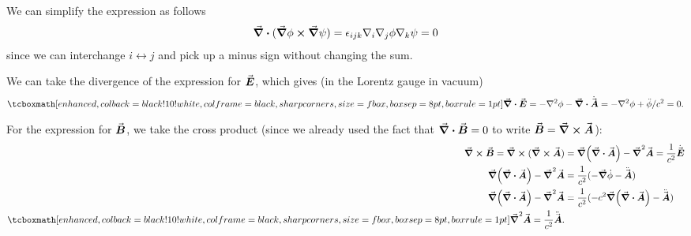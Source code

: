 
We can simplify the expression as follows
\begin{eqnarray}
    \label{eq:div-cross-grads}
    \grad \vdot (\grad\phi \cross \grad\psi) = \epsilon_{ijk} \nabla_{i} \nabla_{j} \phi \nabla_{k}\psi = 0
\end{eqnarray}
since we can interchange $i \leftrightarrow j$ and pick up a minus sign without changing the sum.


We can take the divergence of the expression for $\va*{E}$, which gives (in the Lorentz gauge in vacuum)
\begin{eqnarray}
    \label{eq:div-E}
    \eqbox{
    \grad \vdot \va*{E} = -\laplacian\phi - \grad \vdot \dot{\va*{A}} = -\laplacian\phi + \ddot{\phi}/c^2 = 0
}
.\end{eqnarray}

For the expression for $\va*{B}$, we take the cross product (since we already used the fact that $\grad \vdot \va*{B} = 0$ to write $\va*{B} = \grad \cross \va*{A}$):
\begin{align}
    \label{eq:curl-B}
    \grad \cross \va*{B} = \grad \cross (\grad \cross \va*{A}) &= \grad(\grad \vdot \va*{A}) - \grad^2\va*{A} = \frac{1}{c^2}\dot{\va*{E}} \notag \\
    \grad(\grad \vdot \va*{A}) - \grad^2 \va*{A} &= \frac{1}{c^2} (-\grad\dot{\phi} - \ddot{\va*{A}}) \notag \\
    \grad(\grad \vdot \va*{A}) - \grad^2 \va*{A} &= \frac{1}{c^2} (-c^2\grad(\grad \vdot \va*{A}) - \ddot{\va*{A}}) \notag \\
    \eqbox{\grad^2 \va*{A} = \frac{1}{c^2}\ddot{\va*{A}}}
.\end{align}
 





